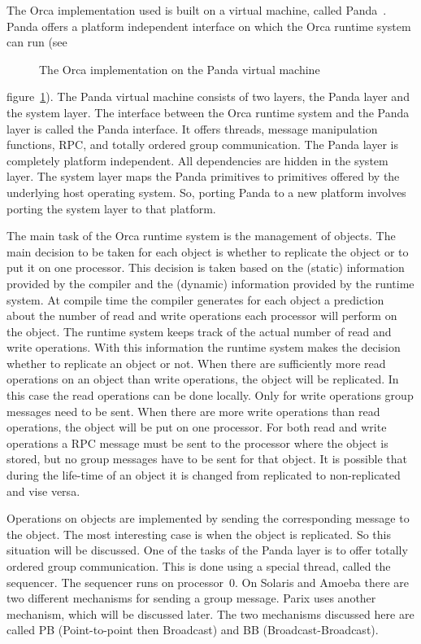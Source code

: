 \documentclass[a4paper,11pt]{article}
\begin{document}
The Orca implementation used is built
on a virtual machine, called Panda~\cite{article:panda}.
Panda offers a platform independent
interface on which the Orca runtime system can run (see
\begin{figure}
\begin{center}

\caption{The Orca implementation on the Panda virtual machine}
\label{fig:panda}
\end{center}
\end{figure}
figure~\ref{fig:panda}). The Panda virtual machine consists of two layers,
the Panda layer and the system layer. The interface between the Orca 
runtime system and
the Panda layer is called the Panda interface. It offers threads,
message manipulation functions, RPC, and totally ordered group communication.
The Panda layer is completely platform independent. All dependencies are
hidden in the system layer. The system layer maps the Panda primitives
to primitives offered by the underlying host operating system. So, porting
Panda to a new platform involves porting the system layer to that platform.

The main task of the Orca runtime system
is the management of objects. The main
decision to be taken for each object is whether to replicate the object
or to put it on one processor. This decision is taken based on the
(static) information provided by the compiler and the (dynamic) information
provided by the runtime system.
At compile time the compiler generates for each object
a prediction about the number of read and write operations each processor
will perform on the object. The runtime system
keeps track of the actual number of
read and write operations. With this information the runtime system
makes the decision
whether to replicate an object or not. When there are sufficiently
more read operations
on an object than write operations, the object will be replicated.
In this case the read operations can be done locally. Only for write
operations group messages need to be sent. When there are more write operations
than read operations, the object will be put on one processor. For both read
and write operations a RPC message must be sent to the processor where the
object is stored, but no group messages have to be sent for that object.
It is possible that during the
life-time of an object it is changed from replicated to non-replicated
and vise versa.

Operations on objects are implemented by sending the
corresponding message to the object. The most interesting case
is when the object is replicated. So this situation will be discussed.
One of the tasks of the Panda layer is to offer totally ordered group
communication.
This is done using a special thread, called the sequencer.
The sequencer runs on processor~0. On Solaris and Amoeba there are two
different mechanisms for sending a group message. Parix uses another
mechanism, which will be discussed later. The two mechanisms discussed here
are called PB
(Point-to-point then Broadcast) and BB (Broadcast-Broadcast).
\end{document}
